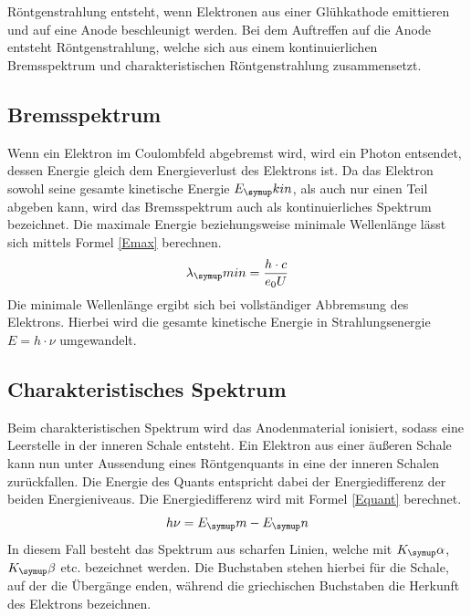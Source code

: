 Röntgenstrahlung entsteht, wenn Elektronen aus einer Glühkathode emittieren und
auf eine Anode beschleunigt werden. Bei dem Auftreffen auf die Anode entsteht
Röntgenstrahlung, welche sich aus einem kontinuierlichen Bremsspektrum und
charakteristischen Röntgenstrahlung zusammensetzt.
\subsection{Bremsspektrum}
Wenn ein Elektron im Coulombfeld abgebremst wird, wird ein Photon entsendet,
dessen Energie gleich dem Energieverlust des Elektrons ist.
Da das Elektron sowohl seine gesamte kinetische Energie $E_\su{kin}$, als auch
nur einen Teil abgeben kann, wird das Bremsspektrum auch als kontinuierliches
Spektrum bezeichnet.
Die maximale Energie beziehungsweise minimale Wellenlänge lässt sich mittels
Formel \eqref{Emax} berechnen.
\begin{equation}
  \lambda_\su{min} = \frac{h\cdot c}{e_0U}
  \label{Emax}
\end{equation}
Die minimale Wellenlänge ergibt sich bei vollständiger Abbremsung des Elektrons.
Hierbei wird die gesamte kinetische Energie in Strahlungsenergie $E=h\cdot\nu$
umgewandelt.
\subsection{Charakteristisches Spektrum}
Beim charakteristischen Spektrum wird das Anodenmaterial ionisiert, sodass
eine Leerstelle in der inneren Schale entsteht. Ein Elektron aus einer äußeren
Schale kann nun  unter Aussendung eines Röntgenquants in eine der inneren
Schalen zurückfallen. Die Energie des Quants entspricht dabei der
Energiedifferenz der beiden Energieniveaus.
Die Energiedifferenz wird mit Formel \eqref{Equant} berechnet.
\begin{equation}
  h\nu = E_\su{m}-E_\su{n}
  \label{Equant}
\end{equation}
In diesem Fall besteht das Spektrum aus scharfen Linien, welche mit $K_\su{\alpha}
$, $K_\su{\beta}$ etc. bezeichnet werden. Die Buchstaben stehen hierbei für die
Schale, auf der die Übergänge enden, während die griechischen Buchstaben die
Herkunft des Elektrons bezeichnen.

